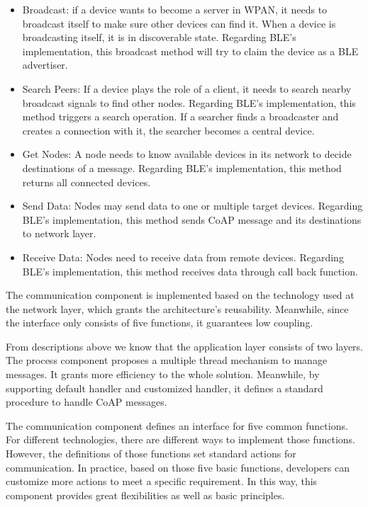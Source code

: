 \documentclass{Nan_Thesis}
\begin{document}
\begin{itemize}
  \item Broadcast: if a device wants to become a server in WPAN, it needs to broadcast itself to make sure other devices can find it. When a device is broadcasting itself, it is in discoverable state. Regarding BLE’s implementation, this broadcast method will try to claim the device as a BLE advertiser.
  \item Search Peers: If a device plays the role of a client, it needs to search nearby broadcast signals to find other nodes. Regarding BLE’s implementation, this method triggers a search operation. If a searcher finds a broadcaster and creates a connection with it, the searcher becomes a central device.  
  \item Get Nodes: A node needs to know available devices in its network to decide destinations of a message. Regarding BLE’s implementation, this method returns all connected devices.
  \item Send Data: Nodes may send data to one or multiple target devices. Regarding BLE’s implementation, this method sends CoAP message and its destinations to network layer.
  \item Receive Data: Nodes need to receive data from remote devices. Regarding BLE’s implementation, this method receives data through call back function.
\end{itemize}

The communication component is implemented based on the technology used at the network layer, which grants the architecture’s reusability. Meanwhile, since the interface only consists of five functions, it guarantees low coupling.

From descriptions above we know that the application layer consists of two layers. The process component proposes a multiple thread mechanism to manage messages.  It grants more efficiency to the whole solution. Meanwhile, by supporting default handler and customized handler, it defines a standard procedure to handle CoAP messages. 

The communication component defines an interface for five common functions. For different technologies, there are different ways to implement those functions. However, the definitions of those functions set standard actions for communication. In practice, based on those five basic functions, developers can customize more actions to meet a specific requirement. In this way, this component provides great flexibilities as well as basic principles.
\end{document}
